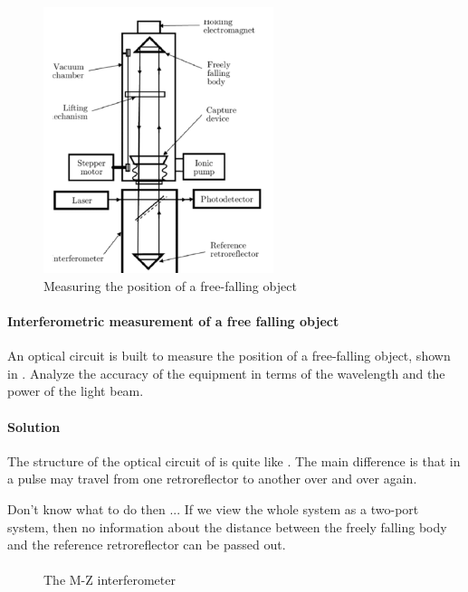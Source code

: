 \documentclass[hyperref, a4paper]{article}
\begin{document}
\begin{figure}
    \centering
    \includegraphics[width=0.6\textwidth]{free-fall.png}
    \caption{Measuring the position of a free-falling object}
    \label{fig:free-fall}
\end{figure}

\paragraph{Interferometric measurement of a free falling object} An optical circuit is built to measure the position of a free-falling object, shown in .
Analyze the accuracy of the equipment in terms of the wavelength and the power of the light beam.

\paragraph{Solution} The structure of the optical circuit of  is quite like .
The main difference is that in  a pulse may travel from one retroreflector to another over and over again.

Don't know what to do then ...
If we view the whole system as a two-port system, then no information about the distance between the freely falling body and the reference retroreflector can be passed out.

\paragraph{}

\begin{figure}
    
    \caption{The M-Z interferometer}
    \label{fig:mz-interferometer}    
\end{figure}
\end{document}

